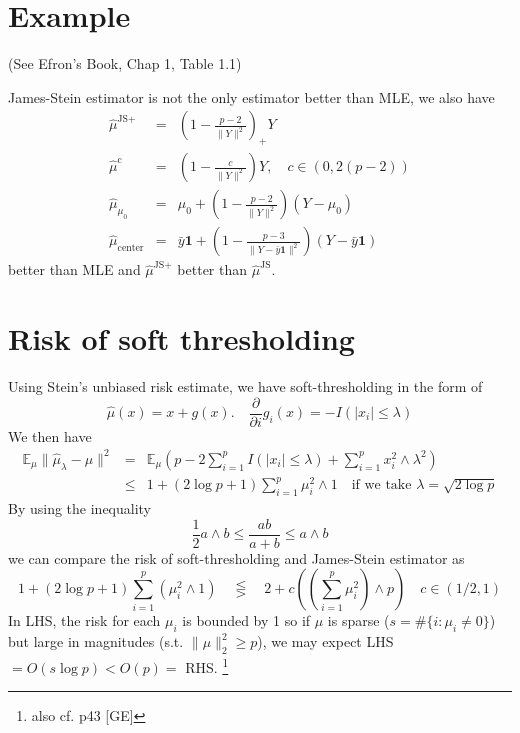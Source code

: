 \documentclass[twoside]{article}
\theoremstyle{plain}
\theoremstyle{definition}
\theoremstyle{remark}
\def\E{{\mathbb E}}
\def\E{{\mathbb E}}
\begin{document}
\section{Example}

(See Efron's Book, Chap 1, Table 1.1)

James-Stein estimator is not the only estimator better than MLE,
we also have
\begin{eqnarray*}
\hat{\mu}^{\text{JS+}}
	&=& \left( 1-\frac{p-2}{\lVert Y \rVert^2}\right)_{+} Y\\
\hat{\mu}^{\text{c}}
	&=& \left( 1-\frac{c}{\lVert Y \rVert^2}\right) Y, \quad
		c \in (0,2(p-2)) \\
\hat{\mu}_{\mu_0} 
	&=& \mu_0 + \left( 1-\frac{p-2}{\lVert Y \rVert^2}\right) (Y-\mu_0) \\
\hat{\mu}_{\text{center}}
&=& \bar{y}\mathbf{1} + \left(1 - \frac{p-3}{\lVert Y-\bar{y}\mathbf{1}\rVert^2}\right) (Y-\bar{y}\mathbf{1})
\end{eqnarray*}
better than MLE and $\hat{\mu}^{\text{JS+}}$ 
better than $\hat{\mu}^{\text{JS}}$.

\section{Risk of soft thresholding}

Using Stein's unbiased risk estimate, we have soft-thresholding
in the form of
\[ \hat{\mu}(x) = x + g(x). \quad 
	\frac{\partial}{\partial i}g_i(x) = - I(\lvert x_i \rvert \le \lambda )
\]
We then have
\begin{eqnarray*}
\E_\mu \lVert \hat{\mu}_\lambda - \mu \rVert^2
&=& \E_\mu \left( p - 2 \sum_{i=1}^p I(\lvert x_i \rvert \le \lambda)
	+ \sum_{i=1}^p x_i^2 \wedge \lambda^2 \right) \\
&\le& 1 +(2\log p + 1)\sum_{i=1}^p \mu_i^2\wedge 1 
	\quad \text{if we take } \lambda = \sqrt{2 \log p}
\end{eqnarray*}
By using the inequality
\[ \frac{1}{2} a \wedge b \le \frac{ab}{a+b} \le a \wedge b \]
we can compare the risk of soft-thresholding and James-Stein estimator
as
\[
	1 + (2\log p + 1) \sum_{i=1}^p ( \mu_i^2 \wedge 1 ) \quad
	\lesseqgtr \quad
	2 + c \left( \left( \sum_{i=1}^p \mu_i^2 \right) \wedge p \right)
	\quad c \in (1/2, 1)
\]
In LHS, the risk for each $\mu_i$ is bounded by 1 so if $\mu$ is sparse ($s=\#\{i: \mu_i \neq 0\}$)
but large in magnitudes (s.t. $\|\mu\|_2^2 \geq p$), we may expect LHS $=O( s\log p) < O(p)=$ RHS. \footnote{also cf. p43 [GE]}
\end{document}

